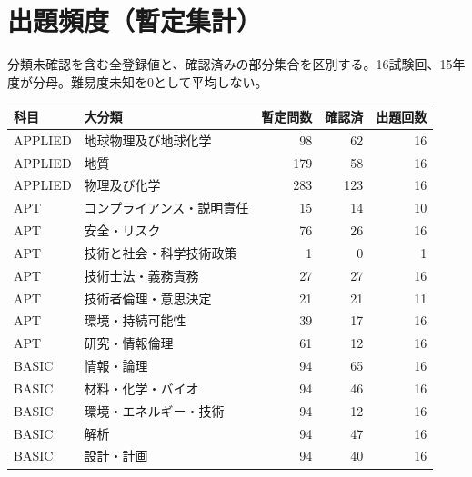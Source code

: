 \chapter{出題頻度（暫定集計）}
分類未確認を含む全登録値と、確認済みの部分集合を区別する。16試験回、15年度が分母。難易度未知を0として平均しない。
\begin{longtable}{p{.16\linewidth}p{.42\linewidth}rrr}
科目 & 大分類 & 暫定問数 & 確認済 & 出題回数\\\hline
APPLIED & 地球物理及び地球化学 & 98 & 62 & 16\\
APPLIED & 地質 & 179 & 58 & 16\\
APPLIED & 物理及び化学 & 283 & 123 & 16\\
APT & コンプライアンス・説明責任 & 15 & 14 & 10\\
APT & 安全・リスク & 76 & 26 & 16\\
APT & 技術と社会・科学技術政策 & 1 & 0 & 1\\
APT & 技術士法・義務責務 & 27 & 27 & 16\\
APT & 技術者倫理・意思決定 & 21 & 21 & 11\\
APT & 環境・持続可能性 & 39 & 17 & 16\\
APT & 研究・情報倫理 & 61 & 12 & 16\\
BASIC & 情報・論理 & 94 & 65 & 16\\
BASIC & 材料・化学・バイオ & 94 & 46 & 16\\
BASIC & 環境・エネルギー・技術 & 94 & 12 & 16\\
BASIC & 解析 & 94 & 47 & 16\\
BASIC & 設計・計画 & 94 & 40 & 16\\
\end{longtable}

